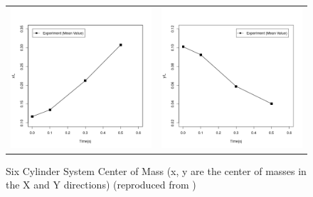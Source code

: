 \begin{figure}[!htb]
\centering
\setlength\fboxsep{0pt}
       \begin{tabular}{cc}
 	   \includegraphics[scale=0.325]{figures/XexpDataR.png} &\includegraphics[scale=0.325]{figures/YexpDataR.png}
 	   \end{tabular}      
\caption{{\small{Six Cylinder System Center of Mass (x, y are the center of masses in the X and Y directions) (reproduced from \cite{zhang})}}}
\label{fig:sys_cm}
\end{figure}

